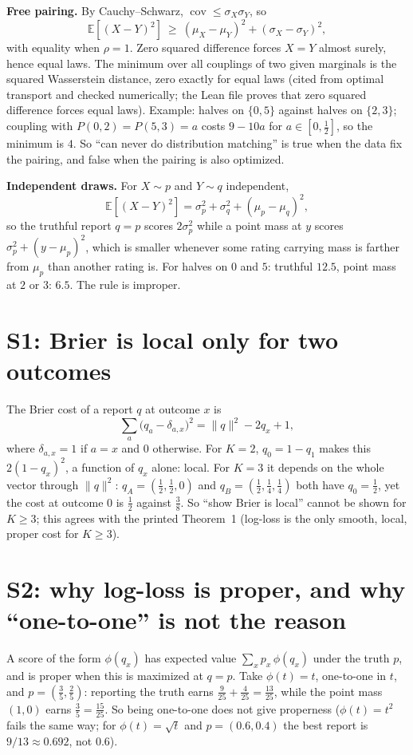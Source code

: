 \documentclass[11pt]{article}
\newcommand{\E}{\mathbb{E}}
\newcommand{\Cov}{\operatorname{cov}}
\begin{document}
\textbf{Free pairing.} By Cauchy--Schwarz, $\Cov\le\sigma_X\sigma_Y$, so
\[
\boxed{\E[(X-Y)^2]\ \ge\ (\mu_X-\mu_Y)^2+(\sigma_X-\sigma_Y)^2},
\]
with equality when $\rho=1$. Zero squared difference forces $X=Y$ almost surely, hence equal laws. The minimum over all couplings of two given marginals is the squared Wasserstein distance, zero exactly for equal laws (cited from optimal transport and checked numerically; the Lean file proves that zero squared difference forces equal laws). Example: halves on $\{0,5\}$ against halves on $\{2,3\}$; coupling with $P(0,2)=P(5,3)=a$ costs $9-10a$ for $a\in[0,\tfrac12]$, so the minimum is $4$. So ``can never do distribution matching'' is true when the data fix the pairing, and false when the pairing is also optimized.

\textbf{Independent draws.} For $X\sim p$ and $Y\sim q$ independent,
\[
\boxed{\E[(X-Y)^2]=\sigma_p^2+\sigma_q^2+(\mu_p-\mu_q)^2},
\]
so the truthful report $q=p$ scores $2\sigma_p^2$ while a point mass at $y$ scores $\sigma_p^2+(y-\mu_p)^2$, which is smaller whenever some rating carrying mass is farther from $\mu_p$ than another rating is. For halves on $0$ and $5$: truthful $12.5$, point mass at $2$ or $3$: $6.5$. The rule is improper.

\section{S1: Brier is local only for two outcomes}

The Brier cost of a report $q$ at outcome $x$ is
\[
\sum_a\big(q_a-\delta_{a,x}\big)^2=\lVert q\rVert^2-2q_x+1,
\]
where $\delta_{a,x}=1$ if $a=x$ and $0$ otherwise.
For $K=2$, $q_0=1-q_1$ makes this $2(1-q_x)^2$, a function of $q_x$ alone: local. For $K=3$ it depends on the whole vector through $\lVert q\rVert^2$: $q_A=(\tfrac12,\tfrac12,0)$ and $q_B=(\tfrac12,\tfrac14,\tfrac14)$ both have $q_0=\tfrac12$, yet the cost at outcome $0$ is $\tfrac12$ against $\tfrac38$. So ``show Brier is local'' cannot be shown for $K\ge3$; this agrees with the printed Theorem~1 (log-loss is the only smooth, local, proper cost for $K\ge3$).

\section{S2: why log-loss is proper, and why ``one-to-one'' is not the reason}

A score of the form $\phi(q_x)$ has expected value $\sum_x p_x\,\phi(q_x)$ under the truth $p$, and is proper when this is maximized at $q=p$. Take $\phi(t)=t$, one-to-one in $t$, and $p=(\tfrac35,\tfrac25)$: reporting the truth earns $\tfrac9{25}+\tfrac4{25}=\tfrac{13}{25}$, while the point mass $(1,0)$ earns $\tfrac35=\tfrac{15}{25}$. So being one-to-one does not give properness ($\phi(t)=t^2$ fails the same way; for $\phi(t)=\sqrt t$ and $p=(0.6,0.4)$ the best report is $9/13\approx0.692$, not $0.6$).
\end{document}
